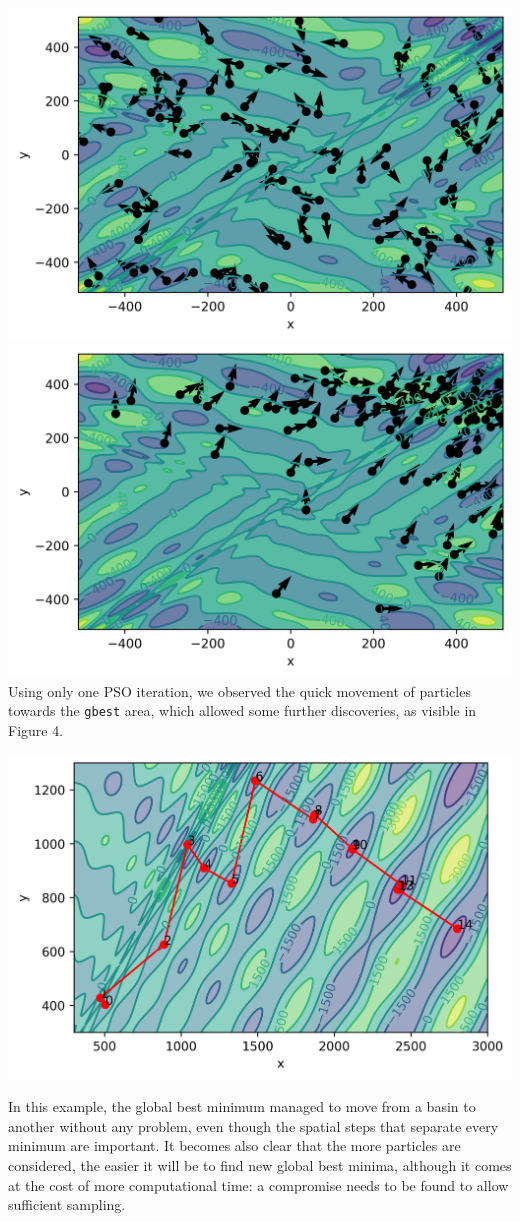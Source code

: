\documentclass[11pt]{article}
\begin{document}
\begin{multicols}{2}
\noindent\includegraphics[width=0.5\columnwidth]{figures/ite0.png}\includegraphics[width=0.5\columnwidth]{figures/ite1.png}
\medskip
Using only one PSO iteration, we observed the quick movement of particles towards the \verb+gbest+ area, which allowed some further discoveries, as visible in Figure 4.
\bigskip

\noindent\begin{center}
    \includegraphics[width=0.9\columnwidth]{figures/eggholder.png}
\end{center} \medskip 
In this example, the global best minimum managed to move from a basin to another without any problem, even though the spatial steps that separate every minimum are important. It becomes also clear that the more particles are considered, the easier it will be to find new global best minima, although it comes at the cost of more computational time: a compromise needs to be found to allow sufficient sampling.


\end{multicols}
\end{document}
